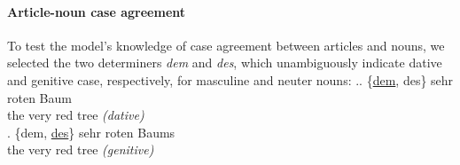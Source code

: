 

\paragraph{Article-noun case agreement}
To test the model's knowledge of case agreement between articles and
nouns, we selected the two determiners \emph{dem} and \emph{des},
which unambiguously indicate dative and genitive case, respectively,
for masculine and neuter nouns: %
\ex.\ag. {\{\underline{dem}, des\}} sehr roten Baum \\
the very red {tree \emph{(dative)}} \\
\bg. {\{dem, \underline{des}\}} sehr roten Baums \\
the very red {tree \emph{(genitive)}} \\



%

